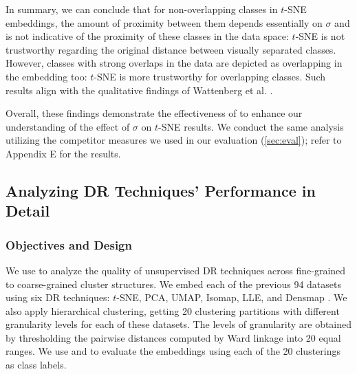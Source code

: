 In summary, we can conclude that for non-overlapping classes in $t$-SNE embeddings, the amount of proximity between them depends essentially on $\sigma$ and is not indicative of the proximity of these classes in the data space: $t$-SNE is not trustworthy regarding the original distance between visually separated classes.  However, classes with strong overlaps in the data are depicted as overlapping in the embedding too: $t$-SNE is more trustworthy for overlapping classes. 
Such results align with the qualitative findings of Wattenberg et al. \cite{wattenberg2016tsnetuning}. 

Overall, these findings demonstrate the effectiveness of \ltc to enhance our understanding of the effect of $\sigma$ on $t$-SNE results. 
We conduct the same analysis utilizing the competitor measures we used in our evaluation (\autoref{sec:eval}); refer to Appendix E for the results. 






\subsection{Analyzing DR Techniques' Performance in Detail}

\label{sec:app_hier}

\subsubsection{Objectives and Design}

We use \ltc to analyze the quality of unsupervised DR techniques across fine-grained to coarse-grained cluster structures. 
We embed each of the previous 94 datasets using six DR techniques: $t$-SNE, PCA, UMAP, Isomap, LLE, and Densmap \cite{narayan21nature}. 
We also apply hierarchical clustering, getting 20 clustering partitions with different granularity levels for each of these datasets. 
The levels of granularity are obtained by thresholding the pairwise distances computed by Ward linkage \cite{ward64taylor} into 20 equal ranges.   
We use \ltc [\CHb{}] and \ltc [DSC] to evaluate the embeddings using each of the 20 clusterings as class labels.


